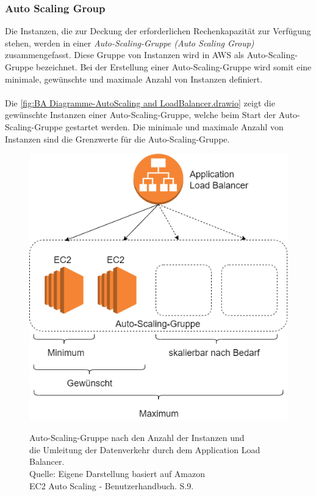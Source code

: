 \subsubsection*{Auto Scaling Group}
Die Instanzen, die zur Deckung der erforderlichen Rechenkapazität zur Verfügung stehen, werden in einer \textit{Auto-Scaling-Gruppe (Auto Scaling Group)} zusammengefasst. Diese Gruppe von Instanzen wird in AWS als Auto-Scaling-Gruppe bezeichnet. Bei der Erstellung einer Auto-Scaling-Gruppe wird somit eine minimale, gewünschte und maximale Anzahl von Instanzen definiert. 
\\\\
Die \autoref{fig:BA Diagramme-AutoScaling and LoadBalancer.drawio} zeigt die gewünschte Instanzen einer Auto-Scaling-Gruppe, welche beim Start der Auto-Scaling-Gruppe gestartet werden. Die minimale und maximale Anzahl von Instanzen sind die Grenzwerte für die Auto-Scaling-Gruppe.  
\begin{figure}[h]
  \centering
  \includegraphics[scale=0.5]{sources/BA Diagramme-AutoScaling and LoadBalancer.drawio}
  \caption[Auto-Scaling-Gruppe nach den Anzahl der Instanzen und Umleitung der Datenverkehr durch dem Application Load Balancer]{}
  \label{fig:BA Diagramme-AutoScaling and LoadBalancer.drawio} 
  Auto-Scaling-Gruppe nach den Anzahl der Instanzen und\\ die Umleitung der Datenverkehr durch dem Application Load Balancer.\\
  Quelle: Eigene Darstellung %
  basiert auf Amazon \\
  EC2 Auto Scaling - Benutzerhandbuch. S.9\cite{AMZ31}.
\end{figure}
\\\\
